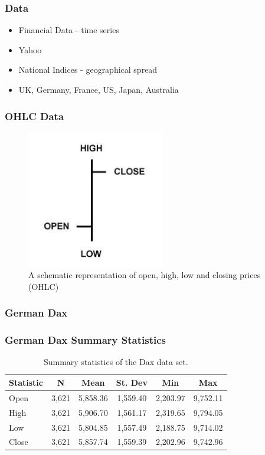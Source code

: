 \documentclass{beamer}
\begin{document}
\begin{frame}
\frametitle{Data}
\begin{itemize}
\item Financial Data - time series
\item Yahoo
\item National Indices - geographical spread
\item UK, Germany, France, US, Japan, Australia
\end{itemize}
\end{frame}

\begin{frame}
\frametitle{OHLC Data}
\begin{figure}
\centering
\includegraphics[width=6cm]{../Figures/chp3_ohlc}
\caption[]{A schematic representation of open, high, low and closing prices (OHLC)}
\label{fig:chp3_ohlc}
\end{figure}
\end{frame}

\begin{frame}
\frametitle{German Dax}

\end{frame}

\begin{frame}
\frametitle{German Dax Summary Statistics}
\begin{table}[!htbp] \centering
\caption[Dax summary statistics.]{Summary statistics of the Dax data set.}
\label{tab:daxsum}
\begin{tabular}{lccccc}
\toprule
Statistic & N & Mean & St. Dev & Min & Max \\
\midrule
Open  & 3,621 & 5,858.36 & 1,559.40 & 2,203.97 & 9,752.11 \\
High  & 3,621 & 5,906.70 & 1,561.17 & 2,319.65 & 9,794.05 \\
Low   & 3,621 & 5,804.85 & 1,557.49 & 2,188.75 & 9,714.02 \\
Close & 3,621 & 5,857.74 & 1,559.39 & 2,202.96 & 9,742.96 \\
\bottomrule
\end{tabular}
\end{table}
\end{frame}
\end{document}
